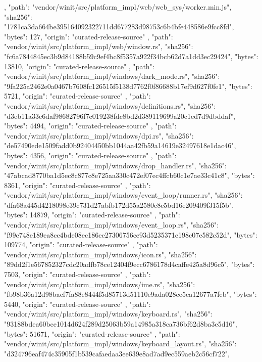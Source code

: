 {{    },
    {
      "path": "vendor/winit/src/platform_impl/web/web_sys/worker.min.js",
      "sha256": "1781ca3da664be395164092322711dd677283d98753c6b4bfe448586e9fcc8fd",
      "bytes": 127,
      "origin": "curated-release-source"
    },
    {
      "path": "vendor/winit/src/platform_impl/web/window.rs",
      "sha256": "fc6a7844845ec3b9d84188b59c9ef4bc8f5357a922f34bcb62d7a1dd3ec29424",
      "bytes": 13810,
      "origin": "curated-release-source"
    },
    {
      "path": "vendor/winit/src/platform_impl/windows/dark_mode.rs",
      "sha256": "9fa225a2462e0a0467b7608fc126515f5138d7762f0f86688b17ef9d627f0fe1",
      "bytes": 5721,
      "origin": "curated-release-source"
    },
    {
      "path": "vendor/winit/src/platform_impl/windows/definitions.rs",
      "sha256": "d3eb11a33c6daf98682796f7c019238fdc8bd2d389119699a20c1ed7d9dbddaf",
      "bytes": 4494,
      "origin": "curated-release-source"
    },
    {
      "path": "vendor/winit/src/platform_impl/windows/dpi.rs",
      "sha256": "de57490ede1509fadd0b92404450bb1044aa42fb59a14619e32497618e1dac46",
      "bytes": 4356,
      "origin": "curated-release-source"
    },
    {
      "path": "vendor/winit/src/platform_impl/windows/drop_handler.rs",
      "sha256": "47abcad8770ba1d5ec8c877c8e725aa330c472ef07ec4ffcb60c1e7ae33c41c8",
      "bytes": 8361,
      "origin": "curated-release-source"
    },
    {
      "path": "vendor/winit/src/platform_impl/windows/event_loop/runner.rs",
      "sha256": "dfa68a445d4218098e39c731d27abfb172d55a2580c8e5bd16e209409f315f5b",
      "bytes": 14879,
      "origin": "curated-release-source"
    },
    {
      "path": "vendor/winit/src/platform_impl/windows/event_loop.rs",
      "sha256": "f99c748e189ea8ce4bde08ec186ee27306756ce93d5235371e198c07e582c52d",
      "bytes": 109774,
      "origin": "curated-release-source"
    },
    {
      "path": "vendor/winit/src/platform_impl/windows/icon.rs",
      "sha256": "89dd2f1e567852327cdc20adfb78ce12404f9ecc6786178d4caffe425a8d96c5",
      "bytes": 7503,
      "origin": "curated-release-source"
    },
    {
      "path": "vendor/winit/src/platform_impl/windows/ime.rs",
      "sha256": "fb98b36a12d98bacf7fa88e8444f5d85713d51110e9ada028ce5ca12677a7feb",
      "bytes": 5440,
      "origin": "curated-release-source"
    },
    {
      "path": "vendor/winit/src/platform_impl/windows/keyboard.rs",
      "sha256": "93188bdea60bce1014d624f289d25063b59a14985a318ca736bf62d8ba3e5d16",
      "bytes": 51671,
      "origin": "curated-release-source"
    },
    {
      "path": "vendor/winit/src/platform_impl/windows/keyboard_layout.rs",
      "sha256": "d324796eaf474c35905f1b539cafaedaa3ee639e8ad7ad9ec559aeb2c56cf722",
}}
